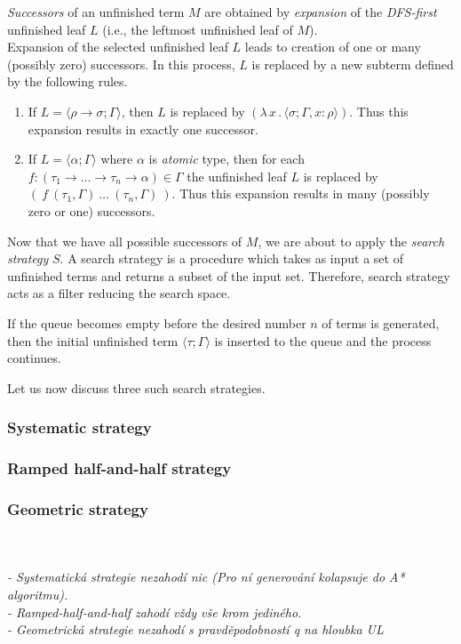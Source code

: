 \documentclass{llncs}
\newcommand{\Lets}{Let us\xspace}
\newcommand{\lamb}[2]{( \lambda \, #1 \, . \, #2 )}
\newcommand{\ar}{\rightarrow\xspace}
\newcommand{\ul}[2]{\langle #1 ; #2 \rangle}
\begin{document}
\textit{Successors} of an unfinished term $M$ are obtained by 
\textit{expansion} of the \mbox{\textit{DFS-first}} unfinished leaf $L$
(i.e., the leftmost unfinished leaf of $M$).\\

Expansion of the selected unfinished leaf $L$ leads to creation of 
one or many (possibly zero) successors.
In this process, $L$ is replaced
by a new subterm defined by the following rules.
\begin{enumerate}
 \item If $L = \ul{\rho \ar \sigma}{\Gamma}$, 
       then $L$ is replaced by $\lamb{x}{\ul{\sigma}{\Gamma,x \colon \rho}}$.
       Thus this expansion results in exactly one successor.  
 \item If $L = \ul{\alpha}{\Gamma}$ where $\alpha$ is \textit{atomic} type,
       then for each 
       \mbox{$f : (\tau_1 \ar \dots \ar \tau_n \ar \alpha) \in \Gamma$}
       the unfinished leaf $L$ is replaced by 
       $(~f~(\tau_1,\Gamma)~\dots~(\tau_n,\Gamma)~)$.
       Thus this expansion results in many (possibly zero or one) successors.
\end{enumerate}

Now that we have all possible successors of $M$, we are about to apply
the \textit{search strategy} $S$. A search strategy is a procedure
which takes as input a set of unfinished terms and returns a subset
of the input set. Therefore, search strategy acts as a filter reducing 
the search space. 

If the queue becomes empty before the desired number $n$ of terms
is generated, then the initial unfinished term $\ul{\tau}{\Gamma}$ 
is inserted to the queue and the process continues.

\Lets now discuss three such search strategies.

\subsubsection{Systematic strategy}
\subsubsection{Ramped half-and-half strategy}
\subsubsection{Geometric strategy}


~\\\\
\textit{
- Systematická strategie nezahodí nic (Pro ní generování 
  kolapsuje do A* algoritmu).\\
- Ramped-half-and-half zahodí vždy vše krom jediného.\\
- Geometrická strategie nezahodí s pravděpodobností q na hloubka UL \\
}
\end{document}
